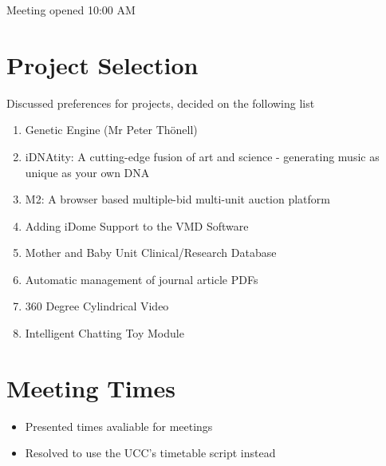 
\date{3rd August, 2011}
\apologies{-}
\absent{-}


\maketitle{}

Meeting opened 10:00 AM

\section{Project Selection}
Discussed preferences for projects, decided on the following list
\begin{enumerate}
\item Genetic Engine (Mr Peter Thönell)
\item iDNAtity: A cutting-edge fusion of art and science - generating music as unique as your own DNA
\item M2: A browser based multiple-bid multi-unit auction platform
\item Adding iDome Support to the VMD Software
\item Mother and Baby Unit Clinical/Research Database
\item Automatic management of journal article PDFs
\item 360 Degree Cylindrical Video
\item Intelligent Chatting Toy Module
\end{enumerate}

\section{Meeting Times}
\begin{itemize}
\item{Presented times avaliable for meetings}
\item{Resolved to use the UCC's timetable script instead}
\end{itemize}


